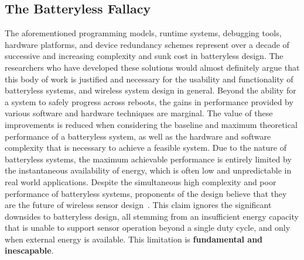 \subsection{The Batteryless Fallacy}
The aforementioned programming models, runtime systems, debugging tools, hardware platforms, and device redundancy schemes represent over a decade of successive and increasing complexity and sunk cost in batteryless design.
The researchers who have developed these solutions would almost definitely argue that this body of work is justified and necessary for the usability and functionality of batteryless systems, and wireless system design in general.
Beyond the ability for a system to safely progress across reboots, the gains in performance provided by various software and hardware techniques are marginal.
The value of these improvements is reduced when considering the baseline and maximum theoretical performance of a batteryless system, as well as the hardware and software complexity that is necessary to achieve a feasible system.
Due to the nature of batteryless systems, the maximum achievable performance is entirely limited by the instantaneous availability of energy, which is often low and unpredictable in real world applications.
Despite the simultaneous high complexity and poor performance of batteryless systems, proponents of the design believe that they are the future of wireless sensor design~\cite{hester2017future}.
This claim ignores the significant downsides to batteryless design, all stemming from an insufficient energy capacity that is unable to support sensor operation beyond a single duty cycle, and only when external energy is available.
This limitation is \textbf{fundamental and inescapable}.%


